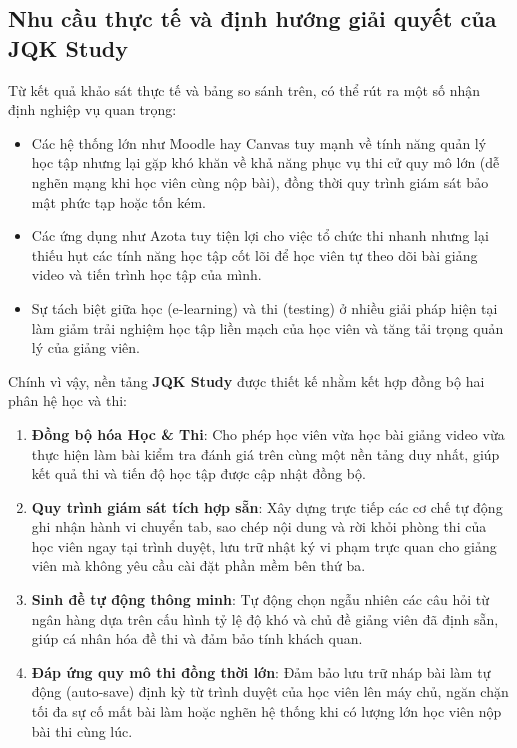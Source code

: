 \documentclass[../DoAn.tex]{subfiles}
\begin{document}
\subsection{Nhu cầu thực tế và định hướng giải quyết của JQK Study}
\label{subsection:2.1.3}

Từ kết quả khảo sát thực tế và bảng so sánh trên, có thể rút ra một số nhận định nghiệp vụ quan trọng:
\begin{itemize}
    \item Các hệ thống lớn như Moodle hay Canvas tuy mạnh về tính năng quản lý học tập nhưng lại gặp khó khăn về khả năng phục vụ thi cử quy mô lớn (dễ nghẽn mạng khi học viên cùng nộp bài), đồng thời quy trình giám sát bảo mật phức tạp hoặc tốn kém.
    \item Các ứng dụng như Azota tuy tiện lợi cho việc tổ chức thi nhanh nhưng lại thiếu hụt các tính năng học tập cốt lõi để học viên tự theo dõi bài giảng video và tiến trình học tập của mình.
    \item Sự tách biệt giữa học (e-learning) và thi (testing) ở nhiều giải pháp hiện tại làm giảm trải nghiệm học tập liền mạch của học viên và tăng tải trọng quản lý của giảng viên.
\end{itemize}

Chính vì vậy, nền tảng \textbf{JQK Study} được thiết kế nhằm kết hợp đồng bộ hai phân hệ học và thi:
\begin{enumerate}
    \item \textbf{Đồng bộ hóa Học \& Thi}: Cho phép học viên vừa học bài giảng video vừa thực hiện làm bài kiểm tra đánh giá trên cùng một nền tảng duy nhất, giúp kết quả thi và tiến độ học tập được cập nhật đồng bộ.
    \item \textbf{Quy trình giám sát tích hợp sẵn}: Xây dựng trực tiếp các cơ chế tự động ghi nhận hành vi chuyển tab, sao chép nội dung và rời khỏi phòng thi của học viên ngay tại trình duyệt, lưu trữ nhật ký vi phạm trực quan cho giảng viên mà không yêu cầu cài đặt phần mềm bên thứ ba.
    \item \textbf{Sinh đề tự động thông minh}: Tự động chọn ngẫu nhiên các câu hỏi từ ngân hàng dựa trên cấu hình tỷ lệ độ khó và chủ đề giảng viên đã định sẵn, giúp cá nhân hóa đề thi và đảm bảo tính khách quan.
    \item \textbf{Đáp ứng quy mô thi đồng thời lớn}: Đảm bảo lưu trữ nháp bài làm tự động (auto-save) định kỳ từ trình duyệt của học viên lên máy chủ, ngăn chặn tối đa sự cố mất bài làm hoặc nghẽn hệ thống khi có lượng lớn học viên nộp bài thi cùng lúc.
\end{enumerate}
\end{document}
